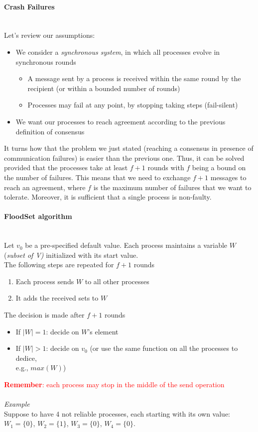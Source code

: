 \documentclass[10pt,a4paper]{article}
\newcommand{\myparagraph}[1]{\paragraph{#1}\mbox{}\\[0.05in]}
\begin{document}
\pagebreak
\myparagraph{Crash Failures}
Let's review our assumptions:
\begin{itemize}
	\item We consider a \textit{synchronous system}, in which all processes evolve in synchronous rounds
	\begin{itemize}
		\item A message sent by a process is received within the same round by the recipient (or within a bounded number of rounds)
		\item Processes may fail at any point, by stopping taking steps (fail-silent)
	\end{itemize}
	\item We want our processes to reach agreement according to the previous definition of consensus
\end{itemize}
It turns how that the problem we just stated (reaching a consensus in presence of communication failures) is easier than the previous one. Thus, it can be solved provided that the processes take at least $f+1$ rounds with $f$ being a bound on the number of failures. This means that we need to exchange $f+1$ messages to reach an agreement, where $f$ is the maximum number of failures that we want to tolerate. Moreover, it is sufficient that a single process is non-faulty.
\myparagraph{FloodSet algorithm}
Let $v_0$ be a pre-specified default value. Each process maintains a variable $W$ (\textit{subset of V)} initialized with its start value. \\ The following steps are repeated for $f+1$ rounds
\begin{enumerate}
	\item Each process sends $W$ to all other processes
	\item It adds the received sets to $W$
\end{enumerate}
The decision is made after $f+1$ rounds
\begin{itemize}
	\item If $|W|=1$: decide on $W$'s element
	\item If $|W|>1$: decide on $v_0$ (or use the same function on all the processes to dedice,\\ e.g., $max(W)$)
\end{itemize}
\textcolor{Red}{\textbf{Remember}: each process may stop in the middle of the send operation} \\ \\
\textit{Example} \\
Suppose to have 4 not reliable processes, each starting with its own value:\\ $W_1=\{0\}$, $W_2=\{1\}$, $W_3=\{0\}$, $W_4=\{0\}$. \\ \\
\end{document}
